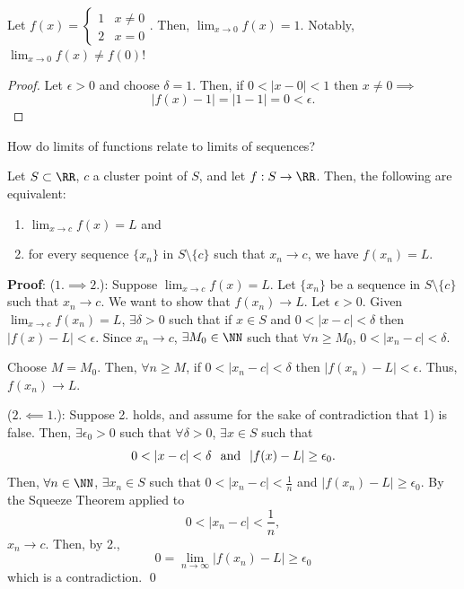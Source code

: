 \begin{example}
Let $f(x) = \begin{cases}1 & x\neq 0 \\ 2 & x=0\end{cases}$. Then, $\lim_{x\to 0} f(x) = 1$. Notably, $\lim_{x\to 0} f(x) \neq f(0)$!
\end{example}
\begin{proof}
Let $\epsilon>0$ and choose $\delta = 1$. Then, if $0<|x-0| <1$ then $x\neq 0 \implies$
\[
|f(x) - 1| = |1-1| = 0 < \epsilon.
\]
\end{proof}

\begin{question}
How do limits of functions relate to limits of sequences?
\end{question}
\begin{theorem}
Let $S\subset \RR$, $c$ a cluster point of $S$, and let $f:S \to \RR$. Then, the following are equivalent:
\begin{enumerate}
    \item $\lim_{x\to c} f(x) = L$ and
    \item for every sequence $\{x_n\}$ in $S\setminus \{c\}$ such that $x_n\to c$, we have $f(x_n) = L$.
\end{enumerate}
\end{theorem}
\textbf{Proof}: ($1.\implies 2.$): Suppose $\lim_{x\to c}f(x) = L$. Let $\{x_n\}$ be a sequence in $S\setminus \{c\}$ such that $x_n \to c$. We want to show that $f(x_n)\to L$. Let $\epsilon>0$. Given $\lim_{x\to c}f(x_n) = L$, $\exists \delta >0$ such that if $x\in S$ and $0< |x-c| <\delta$ then $|f(x) - L|<\epsilon$. Since $x_n\to c$, $\exists M_0 \in \NN$ such that $\forall n\geq M_0$, $0< |x_n-c|<\delta$.

Choose $M = M_0$. Then, $\forall n\geq M$, if $0<|x_n-c| <\delta$ then $|f(x_n)-L|<\epsilon$. Thus, $f(x_n) \to L$.

($2.\impliedby 1.$): Suppose 2. holds, and assume for the sake of contradiction that 1) is false. Then, $\exists \epsilon_0>0$ such that $\forall \delta>0$, $\exists x\in S$ such that 
\[
0 < |x-c|<\delta\hspace{.25cm} \text{and} \hspace{.25cm} |f(x)-L|\geq \epsilon_0.
\]
Then, $\forall n\in\NN$, $\exists x_n\in S$ such that $0<|x_n-c|<\frac{1}{n}$ and $|f(x_n)-L|\geq \epsilon_0$. By the Squeeze Theorem applied to 
\[
0 < |x_n-c|<\frac{1}{n},
\]
$x_n\to c$. Then, by 2., 
\[
0 = \lim_{n\to \infty} |f(x_n) - L| \geq \epsilon_0
\]
which is a contradiction. \qed 

